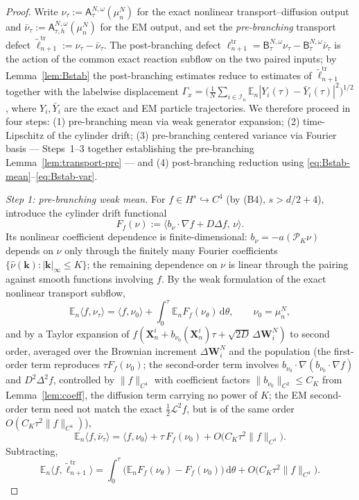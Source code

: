 \documentclass[a4paper,fleqn]{cas-sc}
\theoremstyle{definition}
\theoremstyle{remark}
\begin{document}
\begin{proof}
Write $\nu_\tau:=\mathsf A^{N,\omega}_\tau(\mu^N_n)$ for the exact nonlinear
transport--diffusion output and $\bar\nu_\tau:=\mathsf A^{N,\omega}_{\tau,h}(\mu^N_n)$
for the EM output, and set the \emph{pre-branching} transport defect
$\tilde\ell^{\mathrm{tr}}_{n+1}:=\nu_\tau-\bar\nu_\tau$. The post-branching defect
$\ell^{\mathrm{tr}}_{n+1}=\mathsf B^{N,\omega}_\tau\nu_\tau
-\mathsf B^{N,\omega}_\tau\bar\nu_\tau$ is the action of the common exact reaction
subflow on the two paired inputs; by Lemma~\ref{lem:Bstab} the post-branching
estimates reduce to estimates of $\tilde\ell^{\mathrm{tr}}_{n+1}$ together with the
labelwise displacement
$\Gamma_x=\bigl(\frac1N\sum_{i\in\mathcal I_n}\mathbb E_n|Y_i(\tau)-\bar Y_i(\tau)|^2\bigr)^{1/2}$,
where $Y_i,\bar Y_i$ are the exact and EM particle trajectories. We therefore
proceed in four steps: (1) pre-branching mean via weak generator expansion;
(2) time-Lipschitz of the cylinder drift; (3) pre-branching centered variance
via Fourier basis --- Steps~1--3 together establishing the pre-branching
Lemma~\ref{lem:transport-pre} --- and (4) post-branching reduction using
\eqref{eq:Bstab-mean}--\eqref{eq:Bstab-var}.

\emph{Step 1: pre-branching weak mean.} For $f\in H^s\hookrightarrow C^4$ (by
(B4), $s>d/2+4$), introduce the cylinder drift functional
\[
F_f(\nu):=\langle b_\nu\!\cdot\!\nabla f+D\Delta f,\,\nu\rangle.
\]
Its nonlinear coefficient dependence is finite-dimensional: $b_\nu=-a(\mathcal P_K\nu)$
depends on $\nu$ only through the finitely many Fourier coefficients
$\{\hat\nu(\mathbf k):|\mathbf k|_\infty\le K\}$; the remaining dependence on
$\nu$ is linear through the pairing against smooth functions involving $f$. By
the weak formulation of the exact nonlinear transport subflow,
\[
\mathbb E_n\langle f,\nu_\tau\rangle=\langle f,\nu_0\rangle
+\int_0^\tau\mathbb E_nF_f(\nu_\theta)\,\mathrm d\theta,
\qquad\nu_0=\mu^N_n,
\]
and by a Taylor expansion of $f(\mathbf X^i_n+b_{\nu_0}(\mathbf X^i_n)\tau
+\sqrt{2D}\,\Delta\mathbf W^N_i)$ to second order, averaged over the Brownian
increment $\Delta\mathbf W^N_i$ and the population (the first-order term
reproduces $\tau F_f(\nu_0)$; the second-order term involves
$b_{\nu_0}\!\cdot\!\nabla(b_{\nu_0}\!\cdot\!\nabla f)$ and $D^2\Delta^2 f$,
controlled by $\|f\|_{C^4}$ with coefficient factors $\|b_{\nu_0}\|_{C^2}\le C_K$
from Lemma~\ref{lem:coeff}, the diffusion term carrying no power of $K$; the EM
second-order term need not match the exact $\tfrac12\mathcal L^2f$, but is of the
same order $O(C_K\tau^2\|f\|_{C^4})$),
\[
\mathbb E_n\langle f,\bar\nu_\tau\rangle=\langle f,\nu_0\rangle+\tau\,F_f(\nu_0)
+O\bigl(C_K\tau^2\|f\|_{C^4}\bigr).
\]
Subtracting,
\[
\mathbb E_n\langle f,\tilde\ell^{\mathrm{tr}}_{n+1}\rangle
=\int_0^\tau\bigl(\mathbb E_nF_f(\nu_\theta)-F_f(\nu_0)\bigr)\,\mathrm d\theta
+O\bigl(C_K\tau^2\|f\|_{C^4}\bigr).
\]


\end{proof}
\end{document}
